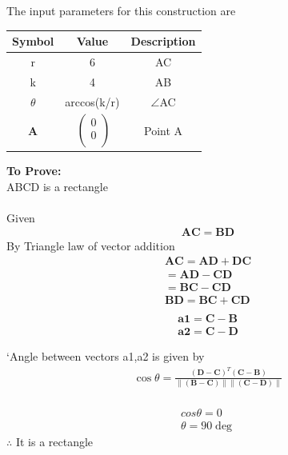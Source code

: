 \documentclass[10pt, a4paper]{article}
\providecommand{\norm}[1]{\left\lVert#1\right\rVert}
\let\vec\mathbf
\begin{document}
The input parameters for this construction are 
\begin{center}
\begin{tabular}{|c|c|c|}
	\hline
	\textbf{Symbol}&\textbf{Value}&\textbf{Description}\\
	\hline
	r&6&AC\\
	\hline
	k&4&AB\\ 
	\hline
	${\theta}$& arccos(k/r)&$ \angle $AC\\
	\hline
	\textbf{A}&$\
	\begin{pmatrix}
		0 \\
		0 \\
	\end{pmatrix}$%
	&Point A\\
	\hline
	
\end{tabular}
\end{center}
\vspace{.25 cm}
\textbf{To Prove:}\\ 
ABCD is a rectangle\\
\\
Given
\begin{align}
 \vec{AC} = \vec{BD} 
\end{align}
By Triangle law of vector addition
\begin{align}
\vec{AC} = \vec{AD} + \vec{DC}\\
= \vec{AD-CD} \\
 = \vec{BC} - \vec{CD}\\
\vec{BD} = \vec{BC} + \vec{CD}\\
\end{align}
\begin{align}
 \vec{a1} = \vec{C} - \vec{B}\\
 \vec{a2} = \vec{C} - \vec{D}
	\end{align}
	
`Angle between vectors a1,a2 is given by \\
\begin{align}
\cos \theta =\frac{\mathbf{(D-C)}^T  \mathbf{(C-B)}}{\norm{\vec{(B-C)}}\norm{\vec{(C-D)}}}
	\end{align}
\vspace{3mm}\\
\begin{align}
cos\theta = 0\\
\theta = 90\deg
\end{align}
$\therefore$ It is a rectangle\\
\end{document}
